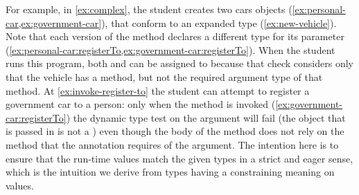 For example, in \cref{ex:complex}, the student
creates two cars objects
(\cref{ex:personal-car,ex:government-car}),
that conform to
an expanded  type (\cref{ex:new-vehicle}).
Note that each version of the  method
declares a different type for its parameter
(\cref{ex:personal-car:registerTo,ex:government-car:registerTo}).
When the student runs this program, both  and
 can be assigned to  because that
check considers only that the vehicle has a  method,
but not the required argument type of that method.
At \cref{ex:invoke-register-to} the student can attempt to register a
government car to a person: only when the method is invoked
(\cref{ex:government-car:registerTo}) the dynamic type test on the
argument will fail (the object that is passed in is not a
) even though the body of the  method
does not rely on the  method that the 
annotation requires of the argument.
The intention here is to ensure that the run-time values
match the given types in a strict and eager sense,
which is the intuition we derive from types having a constraining meaning
on values.




